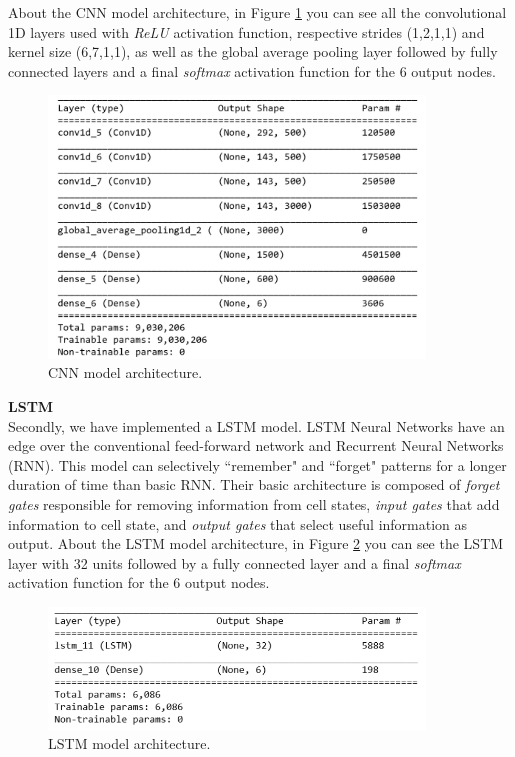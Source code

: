 \documentclass[12pt]{extarticle}
\begin{document}
\noindent About the CNN model architecture, in Figure \ref{fig4} you can see all the convolutional 1D layers used with \textit{ReLU} activation function, respective strides (1,2,1,1) and kernel size (6,7,1,1), as well as the global average pooling layer followed by fully connected layers and a final \textit{softmax} activation function for the 6 output nodes.\\

\begin{figure}[h]
\centering
\includegraphics[width=10cm]{Figures/4.png}
\caption{CNN model architecture.}
\label{fig4}
\end{figure}

\noindent \textbf{LSTM}\\

\noindent Secondly, we have implemented a LSTM model. LSTM Neural Networks have an edge over the conventional feed-forward network and Recurrent Neural Networks (RNN). This model can selectively ``remember" and ``forget" patterns for a longer duration of time than basic RNN. Their basic architecture is composed of \textit{forget gates} responsible for removing information from cell states, \textit{input gates} that add information to cell state, and \textit{output gates} that select useful information as output. About the LSTM model architecture, in Figure \ref{fig5} you can see the LSTM layer with 32 units followed by a fully connected layer and a final \textit{softmax} activation function for the 6 output nodes.

\begin{figure}[h]
\centering
\includegraphics[width=10cm]{Figures/10.png}
\caption{LSTM model architecture.}
\label{fig5}
\end{figure}
\end{document}
